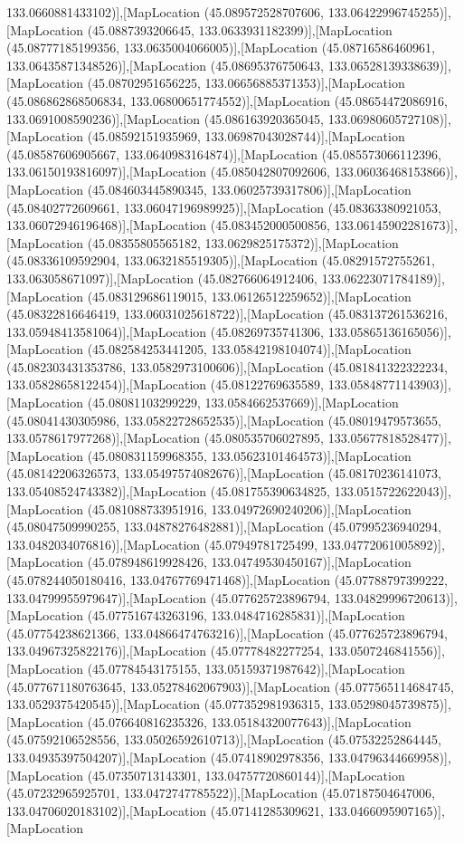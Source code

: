 133.0660881433102)],[MapLocation (45.089572528707606, 133.06422996745255)],[MapLocation (45.0887393206645, 133.0633931182399)],[MapLocation (45.08777185199356, 133.0635004066005)],[MapLocation (45.08716586460961, 133.06435871348526)],[MapLocation (45.08695376750643, 133.06528139338639)],[MapLocation (45.08702951656225, 133.06656885371353)],[MapLocation (45.086862868506834, 133.06800651774552)],[MapLocation (45.08654472086916, 133.0691008590236)],[MapLocation (45.086163920365045, 133.06980605727108)],[MapLocation (45.08592151935969, 133.06987043028744)],[MapLocation (45.08587606905667, 133.0640983164874)],[MapLocation (45.085573066112396, 133.06150193816097)],[MapLocation (45.085042807092606, 133.06036468153866)],[MapLocation (45.084603445890345, 133.06025739317806)],[MapLocation (45.08402772609661, 133.06047196989925)],[MapLocation (45.08363380921053, 133.06072946196468)],[MapLocation (45.083452000500856, 133.06145902281673)],[MapLocation (45.08355805565182, 133.0629825175372)],[MapLocation (45.08336109592904, 133.0632185519305)],[MapLocation (45.08291572755261, 133.063058671097)],[MapLocation (45.082766064912406, 133.06223071784189)],[MapLocation (45.083129686119015, 133.06126512259652)],[MapLocation (45.08322816646419, 133.06031025618722)],[MapLocation (45.083137261536216, 133.05948413581064)],[MapLocation (45.08269735741306, 133.05865136165056)],[MapLocation (45.082584253441205, 133.05842198104074)],[MapLocation (45.082303431353786, 133.0582973100606)],[MapLocation (45.081841322322234, 133.05828658122454)],[MapLocation (45.08122769635589, 133.05848771143903)],[MapLocation (45.08081103299229, 133.0584662537669)],[MapLocation (45.08041430305986, 133.05822728652535)],[MapLocation (45.08019479573655, 133.0578617977268)],[MapLocation (45.080535706027895, 133.05677818528477)],[MapLocation (45.080831159968355, 133.05623101464573)],[MapLocation (45.08142206326573, 133.05497574082676)],[MapLocation (45.08170236141073, 133.05408524743382)],[MapLocation (45.081755390634825, 133.0515722622043)],[MapLocation (45.081088733951916, 133.04972690240206)],[MapLocation (45.08047509990255, 133.04878276482881)],[MapLocation (45.07995236940294, 133.0482034076816)],[MapLocation (45.07949781725499, 133.04772061005892)],[MapLocation (45.078948619928426, 133.04749530450167)],[MapLocation (45.078244050180416, 133.04767769471468)],[MapLocation (45.07788797399222, 133.04799955979647)],[MapLocation (45.077625723896794, 133.04829996720613)],[MapLocation (45.077516743263196, 133.0484716285831)],[MapLocation (45.07754238621366, 133.04866474763216)],[MapLocation (45.077625723896794, 133.04967325822176)],[MapLocation (45.07778482277254, 133.0507246841556)],[MapLocation (45.07784543175155, 133.05159371987642)],[MapLocation (45.077671180763645, 133.05278462067903)],[MapLocation (45.077565114684745, 133.0529375420545)],[MapLocation (45.077352981936315, 133.05298045739875)],[MapLocation (45.076640816235326, 133.05184320077643)],[MapLocation (45.07592106528556, 133.05026592610713)],[MapLocation (45.07532252864445, 133.04935397504207)],[MapLocation (45.07418902978356, 133.04796344669958)],[MapLocation (45.07350713143301, 133.04757720860144)],[MapLocation (45.07232965925701, 133.0472747785522)],[MapLocation (45.07187504647006, 133.04706020183102)],[MapLocation (45.07141285309621, 133.0466095907165)],[MapLocation 